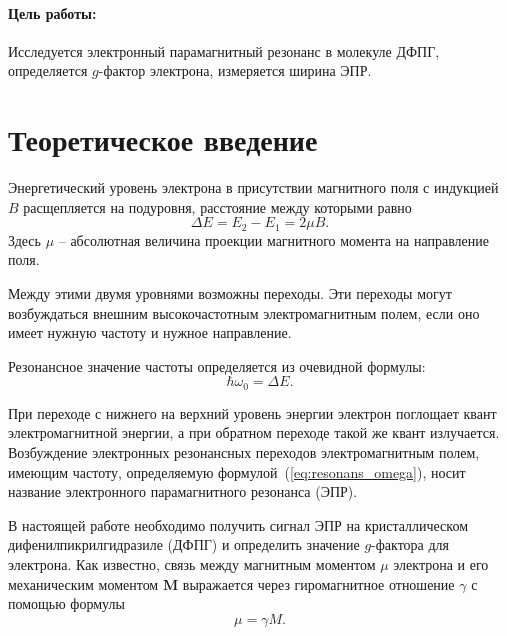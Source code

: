 


    

    \paragraph*{Цель работы:} Исследуется электронный парамагнитный резонанс в молекуле ДФПГ, определяется $g$-фактор электрона, измеряется ширина ЭПР.                                                                              

    \section*{Теоретическое введение}
        Энергетический уровень электрона в присутствии магнитного поля с индукцией $B$ расщепляется на подуровня, расстояние между которыми равно 
        \begin{equation}
            \label{eq:dE}
            \Delta E = E_2 - E_1 = 2\mu B.
        \end{equation}
        Здесь $\mu$ -- абсолютная величина проекции магнитного момента на направление поля.
        
        Между этими двумя уровнями возможны переходы. Эти переходы могут возбуждаться внешним высокочастотным электромагнитным полем, если оно имеет нужную частоту и нужное направление.
        
        Резонансное значение частоты определяется из очевидной формулы:
        \begin{equation}
            \label{eq:resonans_omega}
            \hbar \omega_0 = \Delta E.
        \end{equation}

        При переходе с нижнего на верхний уровень энергии электрон поглощает квант электромагнитной энергии, а при обратном переходе такой же квант излучается. Возбуждение электронных резонансных переходов электромагнитным полем, имеющим частоту, определяемую формулой~(\ref{eq:resonans_omega}), носит название электронного парамагнитного резонанса (ЭПР).
        
        В настоящей работе необходимо получить сигнал ЭПР на кристаллическом дифенилпикрилгидразиле (ДФПГ) и определить значение $g$-фактора для электрона. Как известно, связь между магнитным моментом $\mu$ электрона и его механическим моментом $\mathbf{M}$ выражается через гиромагнитное отношение $\gamma$ с помощью формулы
        \begin{equation}
            \label{eq:gyromagnit}
            \mu = \gamma M.
        \end{equation}
        
